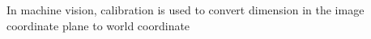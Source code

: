 \documentclass{article}
\begin{document}
	In machine vision, calibration is used to convert dimension in the image coordinate plane to world coordinate \cite{morumachine}
	\newpage
	
	
\end{document}
